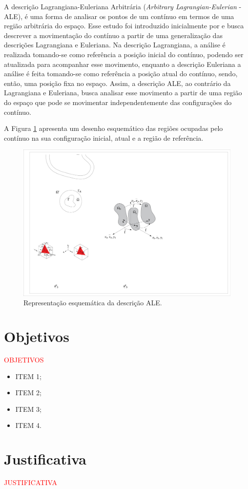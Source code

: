 \documentclass[_ArquivoPrincipal.tex]{subfiles}
\begin{document}
A descrição Lagrangiana-Euleriana Arbitrária (\textit{Arbitrary Lagrangian-Eulerian} - ALE), é uma forma de analisar os pontos de um contínuo em termos de uma região arbitrária do espaço. Esse estudo foi introduzido inicialmente por  e busca descrever a movimentação do contínuo a partir de uma generalização das descrições Lagrangiana e Euleriana. Na descrição Lagrangiana, a análise é realizada tomando-se como referência a posição inicial do contínuo, podendo ser atualizada para acompanhar esse movimento, enquanto a descrição Euleriana a análise é feita tomando-se como referência a posição atual do contínuo, sendo, então, uma posição fixa no espaço. Assim, a descrição ALE, ao contrário da Lagrangiana e Euleriana, busca analisar esse movimento a partir de uma região do espaço que pode se movimentar independentemente das configurações do contínuo.

A Figura \ref{fig:ALE} apresenta um desenho esquemático das regiões ocupadas pelo contínuo na sua configuração inicial, atual e a região de referência.

\begin{figure}[h]
    \centering
    \includegraphics[width=0.5\linewidth]{Figuras/ALE1.pdf}
    \caption{Representação esquemática da descrição ALE.}
    \label{fig:ALE}
\end{figure}

\section{Objetivos}

\textcolor{red}{OBJETIVOS}

\begin{itemize}
    \item ITEM 1;

    \item ITEM 2;

    \item ITEM 3;

    \item ITEM 4.
\end{itemize}

\section{Justificativa}

\textcolor{red}{JUSTIFICATIVA}
\end{document}
